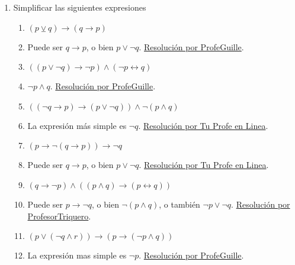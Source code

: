 \documentclass[a4paper]{article}
\newcommand{\answer}{\item[**]}
\newcommand{\exercise}{\item}
\newcommand{\then}{\to}
\newcommand{\eq}{\leftrightarrow}
\newcommand{\xor}{\veebar}
\newcommand{\Eq}{\Leftrightarrow}
\begin{document}
\begin{enumerate}[resume]
\begin{multicols}{2}
\begin{enumerate} [label=(\alph*)]
		\item $\neg (p\land q\then \neg r)	\Eq 	p\land q\lor r$
		\answer La \href{https://www.wolframalpha.com/input?i=not+%28%28p+and+q%29+%3D%3E+not+r%29+%3C%3D%3E++%28%28p+and+q%29+or+r%29}{tabla de verdad} revela que es una contingencia. Por lo tanto, no son equivalentes. 

		\item $p\then (q\land r\land s) \Eq (p\then q)\land (p\then r)\land (p\then s)$
		\answer La \href{https://www.wolframalpha.com/input?i=truth+table%3A+%28p+%3D%3E+%28q+and+r+and+s%29%29+%3C%3D%3E+%28%28p+%3D%3E+q%29+and+%28p+%3D%3E+r%29+and+%28p+%3D%3E+s%29%29}{tabla de verdad} revela que es una tautología. Por lo tanto, son equivalentes. Esta regla de equivalencia no tiene nombre.

	\end{enumerate}
	\end{multicols}

	\exercise Simplificar las siguientes expresiones
	\begin{multicols}{2}
	\begin{enumerate} [label=(\alph*)]
		\item $(p \xor q) \then (q \then p)$
		\answer Puede ser $q \then p$, o bien $p \lor \neg q$. \href{https://youtu.be/5r8S-wMJq7I}{Resolución por ProfeGuille}.

		\item $((p \lor \neg q) \then \neg p) \land (\neg p \eq q)$
		\answer $\neg p \land q$. \href{https://youtu.be/Ayk4qXcoiOM}{Resolución por ProfeGuille}.

		\item $((\neg q \then p) \then (p \lor \neg q)) \land \neg (p \land q)$
		\answer La expresión más simple es $\neg q$. \href{https://youtu.be/BOydu7cpv70?t=884}{Resolución por Tu Profe en Linea}.

		\item $( p \then \neg (q \then p) ) \then \neg q$
		\answer Puede ser $q \then p$, o bien $p \lor \neg q$. \href{https://youtu.be/BOydu7cpv70?t=334}{Resolución por Tu Profe en Linea}.

		\item $(q \then \neg p) \land ((p \land q)\then(p \eq q))$
		\answer Puede ser $p \then \neg q$, o bien $\neg ( p \land q )$, o también $\neg p \lor \neg q$. \href{https://youtu.be/p005yi28rgk?t=392}{Resolución por ProfesorTriquero}.

		\item $(p \lor (\neg q \land r)) \then (p \then (\neg p \land q))$
		\answer La expresión mas simple es $\neg p$. \href{https://youtu.be/UZDME4cZxNc}{Resolución por ProfeGuille}.


\end{enumerate}
\end{multicols}
\end{enumerate}
\end{document}
